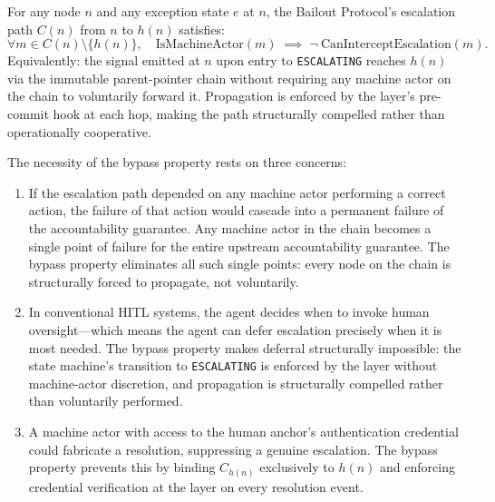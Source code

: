 \begin{definition}
\label{def:bypass}
For any node $n$ and any exception state $e$ at $n$, the Bailout Protocol's escalation path $C(n)$ from $n$ to $h(n)$ satisfies:
\begin{equation}
\forall m \in C(n) \setminus \{h(n)\},\quad
\text{IsMachineActor}(m) \;\implies\; \neg\ \text{CanInterceptEscalation}(m).
\tag{BP-1}
\end{equation}
Equivalently: the signal emitted at $n$ upon entry to \texttt{ESCALATING} reaches $h(n)$ via the immutable parent-pointer chain without requiring any machine actor on the chain to voluntarily forward it. Propagation is enforced by the \fact{} layer's pre-commit hook at each hop, making the path structurally compelled rather than operationally cooperative.
\end{definition}

The necessity of the bypass property rests on three concerns:

\begin{enumerate}\itemsep=0pt
\item[$\textbf{Single point of failure.}$] If the escalation path depended on any machine actor performing a correct action, the failure of that action would cascade into a permanent failure of the accountability guarantee. Any machine actor in the chain becomes a single point of failure for the entire upstream accountability guarantee. The bypass property eliminates all such single points: every node on the chain is structurally forced to propagate, not voluntarily.

\item[$\textbf{Deferral attack.}$] In conventional HITL systems, the agent decides when to invoke human oversight---which means the agent can defer escalation precisely when it is most needed. The bypass property makes deferral structurally impossible: the state machine's transition to \texttt{ESCALATING} is enforced by the \fact{} layer without machine-actor discretion, and propagation is structurally compelled rather than voluntarily performed.

\item[$\textbf{Credential substitution.}$] A machine actor with access to the human anchor's authentication credential could fabricate a resolution, suppressing a genuine escalation. The bypass property prevents this by binding $C_{h(n)}$ exclusively to $h(n)$ and enforcing credential verification at the \fact{} layer on every resolution event.
\end{enumerate}

